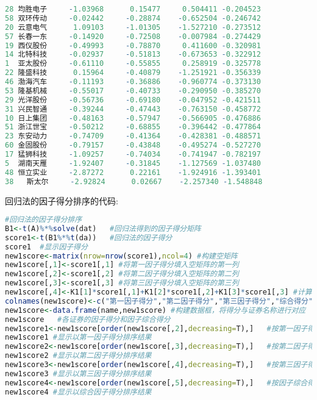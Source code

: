 \documentclass[11pt,a4paper,oneside]{book}
\begin{document}
\begin{lstlisting}[language=r]
28 均胜电子     -1.03968      0.15477     0.504411 -0.204523
58 双环传动     -0.02442     -0.28874    -0.652504 -0.246742
20 云意电气      1.09103     -1.01305    -1.527210 -0.273512
57 长春一东     -0.14920     -0.72508    -0.007984 -0.274429
19 西仪股份     -0.49993     -0.78870     0.411600 -0.320981
14 北特科技     -0.02937     -0.51813    -0.673653 -0.322912
1  亚太股份     -0.61110     -0.55855     0.258919 -0.325778
22 隆盛科技      0.15964     -0.40879    -1.251921 -0.356339
46 渤海汽车     -0.11193     -0.36886    -0.960774 -0.373130
53 隆基机械     -0.55017     -0.40733    -0.290950 -0.385270
29 光洋股份     -0.56736     -0.69180    -0.047952 -0.421511
31 兴民智通     -0.39244     -0.47443    -0.763150 -0.458772
10 日上集团     -0.48163     -0.57947    -0.566905 -0.476886
51 浙江世宝     -0.50212     -0.68855    -0.396442 -0.477864
23 东安动力     -0.74709     -0.41364    -0.428381 -0.488571
60 金固股份     -0.79157     -0.43848    -0.495274 -0.527270
17 猛狮科技     -1.09257     -0.74034    -0.741947 -0.782197
5  湖南天雁     -1.92407     -0.31845    -1.127569 -1.037480
48 恒立实业     -2.87272      0.22161    -1.924916 -1.393401
38   斯太尔     -2.92824      0.02667    -2.257340 -1.548848
\end{lstlisting}

回归法的因子得分排序的代码:
\begin{lstlisting}[language=r]
#回归法的因子得分排序
B1<-t(A)%*%solve(dat)   #回归法得到的因子得分矩阵
score1<-t(B1%*%t(da))   #回归法的因子得分
score1  #显示因子得分
new1score<-matrix(nrow=nrow(score1),ncol=4) #构建空矩阵
new1score[,1]<-score1[,1] #将第一因子得分填入空矩阵的第一列
new1score[,2]<-score1[,2] #将第二因子得分填入空矩阵的第二列
new1score[,3]<-score1[,3] #将第三因子得分填入空矩阵的第三列
new1score[,4]<-K1[1]*score1[,1]+K1[2]*score1[,2]+K1[3]*score1[,3] #计算综合得分
colnames(new1score)<-c("第一因子得分","第二因子得分","第三因子得分","综合得分") #进行命名
new1score<-data.frame(name,new1score) #构建数据框，将得分与证券名称进行对应
new1score   #各证券的因子得分和因子综合得分
new1score1<-new1score[order(new1score[,2],decreasing=T),]   #按第一因子得分排序
new1score1 #显示以第一因子得分排序结果
new1score2<-new1score[order(new1score[,3],decreasing=T),]   #按第二因子得分排序
new1score2 #显示以第二因子得分排序结果
new1score3<-new1score[order(new1score[,4],decreasing=T),]   #按第三因子得分排序
new1score3 #显示以第三因子得分排序结果
new1score4<-new1score[order(new1score[,5],decreasing=T),]   #按因子综合得分排序
new1score4 #显示以综合因子得分排序结果
\end{lstlisting}
\end{document}
